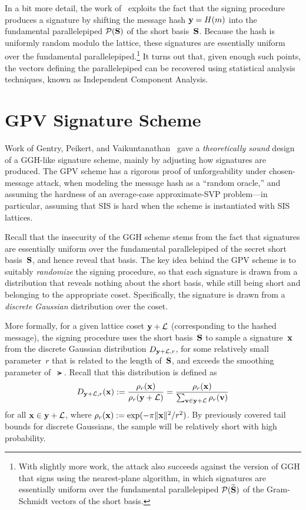 \documentclass[11pt]{article}
\begin{document}
In a bit more detail, the work of~\cite{DBLP:journals/joc/NguyenR09}
exploits the fact that the signing procedure produces a signature by
shifting the message hash $\mathbf{y} = H(m)$ into the fundamental
parallelepiped $\mathcal{P}(\mathbf{S})$ of the short basis~$\mathbf{S}$. Because the
hash is uniformly random modulo the lattice, these signatures are
essentially uniform over the fundamental parallelepiped.\footnote{With
  slightly more work, the attack also succeeds against the version of
  GGH that signs using the nearest-plane algorithm, in which
  signatures are essentially uniform over the fundamental
  parallelepiped $\mathcal{P}(\widetilde{\mathbf{S}})$ of the Gram-Schmidt vectors of
  the short basis.} It turns out that, given enough such points, the
vectors defining the parallelepiped can be recovered using statistical
analysis techniques, known as Independent Component Analysis.

\section{GPV Signature Scheme}
\label{sec:gpv-signatures}

Work of Gentry, Peikert, and
Vaikuntanathan~\cite{DBLP:conf/stoc/GentryPV08} gave a
\emph{theoretically sound} design of a GGH-like signature scheme,
mainly by adjusting how signatures are produced. The GPV scheme has a
rigorous proof of unforgeability under chosen-message attack, when
modeling the message hash as a ``random oracle,'' and assuming the
hardness of an average-case approximate-SVP problem---in particular,
assuming that SIS is hard when the scheme is instantiated with SIS
lattices.

Recall that the insecurity of the GGH scheme stems from the fact that
signatures are essentially uniform over the fundamental parallelepiped
of the secret short basis~$\mathbf{S}$, and hence reveal that basis. The
key idea behind the GPV scheme is to suitably \emph{randomize} the
signing procedure, so that each signature is drawn from a distribution
that reveals nothing about the short basis, while still being short
and belonging to the appropriate coset. Specifically, the signature is
drawn from a \emph{discrete Gaussian} distribution over the coset.

More formally, for a given lattice coset $\mathbf{y} + \mathcal{L}$ (corresponding
to the hashed message), the signing procedure uses the short
basis~$\mathbf{S}$ to sample a signature~$\mathbf{x}$ from the discrete Gaussian
distribution $D_{\mathbf{y}+\mathcal{L},r}$, for some relatively small
parameter~$r$ that is related to the length of~$\mathbf{S}$, and exceeds
the smoothing parameter of~$\lat$. Recall that this distribution is
defined as
\[ D_{\mathbf{y}+\mathcal{L},r}(\mathbf{x}) := \frac{\rho_r(\mathbf{x})}{\rho_r(\mathbf{y}+\mathcal{L})}
  = \frac{\rho_{r}(\mathbf{x})}{\sum_{\mathbf{v} \in \mathbf{y}+\mathcal{L}}
    \rho_{r}(\mathbf{v})} \] for all $\mathbf{x} \in \mathbf{y} + \mathcal{L}$, where
$\rho_{r}(\mathbf{x}) := \exp(-\pi \lVert\mathbf{x}\rVert^{2}/r^{2})$. By
previously covered tail bounds for discrete Gaussians, the sample will
be relatively short with high probability.
\end{document}
